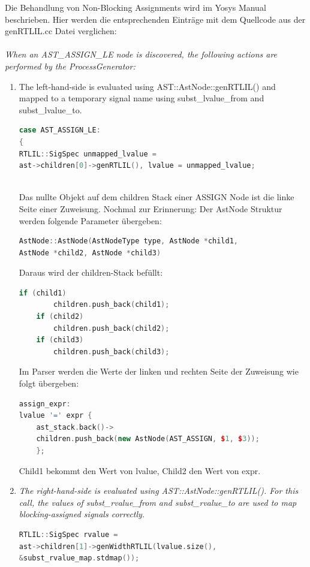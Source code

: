 \documentclass[11pt]{report}
\begin{document}
Die Behandlung von Non-Blocking Assignments wird im Yosys Manual beschrieben. Hier werden die entsprechenden Einträge mit dem Quellcode aus der genRTLIL.cc Datei verglichen:
\\
\\
\textit{
When an AST\_ASSIGN\_LE node is discovered, the following actions are performed by the ProcessGenerator:
}
\begin{enumerate}
  \item The left-hand-side is evaluated using AST::AstNode::genRTLIL() and mapped to a temporary signal name using subst\_lvalue\_from and subst\_lvalue\_to.
  \begin{lstlisting}[language=C++]
case AST_ASSIGN_LE:
{
RTLIL::SigSpec unmapped_lvalue = 
ast->children[0]->genRTLIL(), lvalue = unmapped_lvalue;
	
  \end{lstlisting}
Das nullte Objekt auf dem children Stack einer ASSIGN Node ist die linke Seite einer Zuweisung.
Nochmal zur Erinnerung: Der AstNode Struktur werden folgende Parameter übergeben:
\begin{lstlisting}[language=C++]
AstNode::AstNode(AstNodeType type, AstNode *child1, 
AstNode *child2, AstNode *child3)
\end{lstlisting}

Daraus wird der children-Stack befüllt:
\begin{lstlisting}[language=C++]
	if (child1)
		children.push_back(child1);
	if (child2)
		children.push_back(child2);
	if (child3)
		children.push_back(child3);
\end{lstlisting}
 
Im Parser werden die Werte der linken und rechten Seite der Zuweisung wie folgt übergeben:
\begin{lstlisting}[language=C++]
assign_expr:
lvalue '=' expr {
	ast_stack.back()->
	children.push_back(new AstNode(AST_ASSIGN, $1, $3));
	};	
\end{lstlisting}

Child1 bekommt den Wert von lvalue, Child2 den Wert von expr.

  \item \textit{The right-hand-side is evaluated using AST::AstNode::genRTLIL(). For this call, the values of subst\_rvalue\_from and subst\_rvalue\_to are used to map blocking-assigned signals correctly.}
\begin{lstlisting}[language=C++]
RTLIL::SigSpec rvalue = 
ast->children[1]->genWidthRTLIL(lvalue.size(), 
&subst_rvalue_map.stdmap());
\end{lstlisting}   
  

\end{enumerate}
\end{document}
